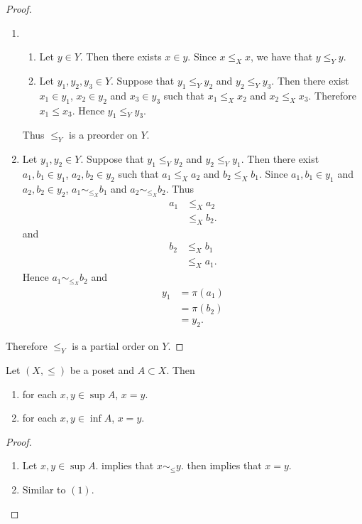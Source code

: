 \documentclass{book}
\begin{document}
	\begin{proof}\
		\begin{enumerate}
			\item 
			\begin{enumerate}
				\item Let $y \in Y$. Then there exists $x \in y$. Since $x \leq_X x$, we have that $y \leq_Y y$.
				\item Let $y_1, y_2, y_3 \in Y$. Suppose that $y_1 \leq_Y y_2$ and $y_2 \leq_Y y_3$. Then there exist $x_1 \in y_1$, $x_2 \in y_2$ and $x_3 \in y_3$ such that $x_1 \leq_X x_2$ and $x_2 \leq_X x_3$. Therefore $x_1 \leq x_3$. Hence $y_1 \leq_Y y_3$.
			\end{enumerate}
			Thus $\leq_Y$ is a preorder on $Y$.
			\item Let $y_1, y_2 \in Y$. Suppose that $y_1 \leq_Y y_2$ and $y_2 \leq_Y y_1$. Then there exist $a_1, b_1 \in y_1$, $a_2, b_2 \in y_2$ such that $a_1 \leq_X a_2$ and $b_2 \leq_X b_1$. Since $a_1, b_1 \in y_1$ and $a_2, b_2 \in y_2$, $a_1 \sim_{\leq_X} b_1$ and $a_2 \sim_{\leq_X} b_2$. Thus 
			\begin{align*}
				a_1
				& \leq_X a_2 \\
				& \leq_X b_2.
			\end{align*}
			and 
			\begin{align*}
				b_2
				& \leq_X b_1 \\
				& \leq_X a_1.
			\end{align*}
			Hence $a_1 \sim_{\leq_X} b_2$ and 
			\begin{align*}
				y_1
				& = \pi(a_1) \\
				& = \pi(b_2) \\
				& = y_2.
			\end{align*} 
		\end{enumerate}
		Therefore $\leq_Y$ is a partial order on $Y$. 
	\end{proof}
	
	\begin{ex} 
		Let $(X, \leq)$ be a poset and $A \subset X$. Then
		\begin{enumerate}
			\item for each $x, y \in \sup A$, $x = y$.
			\item for each $x,y \in \inf A$, $x = y$.
		\end{enumerate}   
	\end{ex}
	
	\begin{proof}\
		\begin{enumerate}
			\item Let $x, y \in \sup A$.  implies that $x \sim_{\leq} y$.  then implies that $x = y$.
			\item Similar to $(1)$.
		\end{enumerate}
	\end{proof}
	
\end{document}

